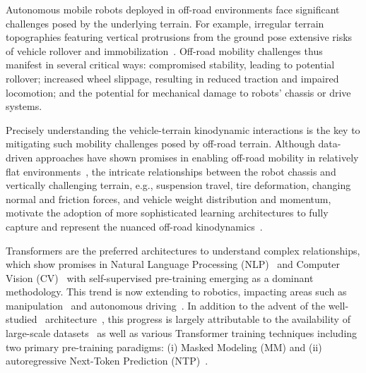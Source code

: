 Autonomous mobile robots deployed in off-road environments face significant challenges posed by the underlying terrain. 
For example, irregular terrain topographies featuring vertical protrusions from the ground pose extensive risks of vehicle rollover and immobilization~\cite{borges2022survey, lee2023learning, datar2024wheeled}. 
Off-road mobility challenges thus manifest in several critical ways: compromised stability, leading to potential rollover; increased wheel slippage, resulting in reduced traction and impaired locomotion; and the potential for mechanical damage to robots' chassis or drive systems.

Precisely understanding the vehicle-terrain kinodynamic interactions is the key to mitigating such mobility challenges posed by off-road terrain. Although data-driven approaches have shown promises in enabling off-road mobility in relatively flat environments~\cite{overbye2020fast, pan2020imitation, xiao2021learning, sivaprakasam2021improving, fan2021step, karnan2022vi, xiao2022motion, borges2022survey, dashora2022hybrid, triest2022tartandrive, sharma2023ramp, castro2023does, pokhrel2024cahsor, cai2024evora}, the intricate relationships between the robot chassis and vertically challenging terrain, e.g., suspension travel, tire deformation, changing normal and friction forces, and vehicle weight distribution and momentum, motivate the adoption of more sophisticated learning architectures to fully capture and represent the nuanced off-road kinodynamics~\cite{datar2024wheeled}. 

Transformers are the preferred architectures to understand complex relationships, which show promises in Natural Language Processing (NLP)~\cite{radford2018improving, devlin2019bert, radford2019language, brown2020language} and Computer Vision (CV)~\cite{he2022masked, feichtenhofer2022masked, geng2022multimodal, oquab2023dinov2, karypidis2024dinoforesight, patraucean2024trecvit} with self-supervised pre-training emerging as a dominant methodology. 
This trend is now extending to robotics, impacting areas such as manipulation~\cite{o2024open, du2023video, seo2023masked, seo2023multiview, hu2024video} and autonomous driving~\cite{hu2023gaia1, mao2023gptdriver, hu2024drivingworld, bar2024navigation, xiao2024anycar, mattamala2024wild, ai2023invariance}. In addition to the advent of the well-studied \tr~architecture~\cite{vaswani2017attention, dosovitskiy2021image}, this progress is largely attributable to the availability of large-scale datasets~\cite{o2024open, sun2020scalability, nuscenes}
as well as various Transformer training techniques including two primary pre-training paradigms: (i) Masked Modeling (MM) and (ii) autoregressive Next-Token Prediction (NTP)~\cite{chen2024next}. 

